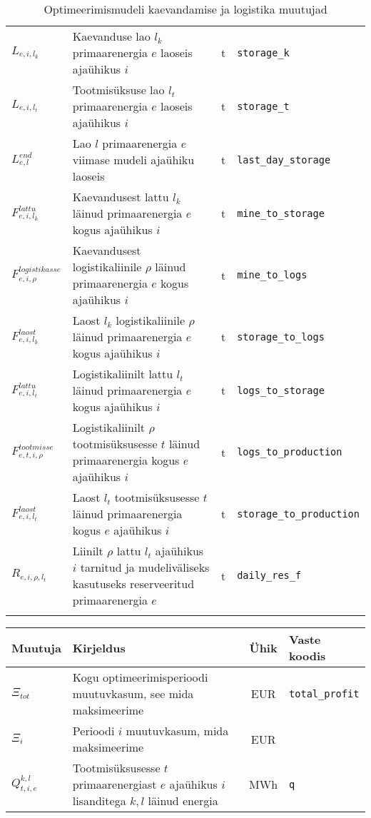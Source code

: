 \begin{landscape}
\begin{longtable}{l l c l}
$L_{e,i,l_k}$ & Kaevanduse lao $l_k$ primaarenergia $e$ laoseis ajaühikus $i$ &t & \texttt{storage\_k}\\
$L_{e,i,l_t}$ & Tootmisüksuse lao $l_t$ primaarenergia $e$ laoseis ajaühikus $i$ &t & \texttt{storage\_t}\\
$L^{end}_{e,l}$ & Lao $l$ primaarenergia $e$ viimase mudeli ajaühiku laoseis & t & \texttt{last\_day\_storage} \\
$F^{lattu}_{e,i,l_k}$ & Kaevandusest lattu $l_k$ läinud primaarenergia $e$ kogus ajaühikus $i$ &t & \texttt{mine\_to\_storage}\\
$F^{logistikasse}_{e,i,\rho}$ & Kaevandusest logistikaliinile $\rho$ läinud primaarenergia $e$ kogus ajaühikus $i$ &t & \texttt{mine\_to\_logs}\\
$F^{laost}_{e,i,l_k}$& Laost $l_k$ logistikaliinile $\rho$ läinud primaarenergia $e$ kogus ajaühikus $i$ &t & \texttt{storage\_to\_logs}\\
$F^{lattu}_{e,i,l_t}$& Logistikaliinilt lattu $l_t$ läinud primaarenergia $e$ kogus ajaühikus $i$ &t & \texttt{logs\_to\_storage} \\
$F^{tootmisse}_{e,t,i,\rho}$& Logistikaliinilt $\rho$ tootmisüksusesse $t$ läinud primaarenergia kogus $e$ ajaühikus $i$ &t & \texttt{logs\_to\_production}\\
$F^{laost}_{e,i,l_t}$& Laost $l_t$ tootmisüksusesse $t$ läinud primaarenergia kogus $e$ ajaühikus $i$ &t & \texttt{storage\_to\_production}\\
$R_{e,i,\rho, l_t}$ & Liinilt $\rho$ lattu $l_t$ ajaühikus $i$ tarnitud ja mudeliväliseks kasutuseks reserveeritud primaarenergia $e$ & t & \texttt{daily\_res\_f}\\
\caption{Optimeerimismudeli kaevandamise ja logistika muutujad\label{tab:k_muutujad}}
\end{longtable}

\begin{longtable}{l l c l}
Muutuja & Kirjeldus & Ühik & Vaste koodis\\
\hline
$\Xi_{tot}$ & Kogu optimeerimisperioodi muutuvkasum, see mida maksimeerime & EUR & \texttt{total\_profit}\\
$\Xi_{i}$ & Perioodi $i$ muutuvkasum, mida maksimeerime & EUR & \\
$Q^{k,l}_{t,i,e}$&Tootmisüksusesse $t$ primaarenergiast $e$ ajaühikus $i$ lisanditega $k,l$ läinud energia &MWh &\texttt{q}\\


\end{longtable}
\end{landscape}
